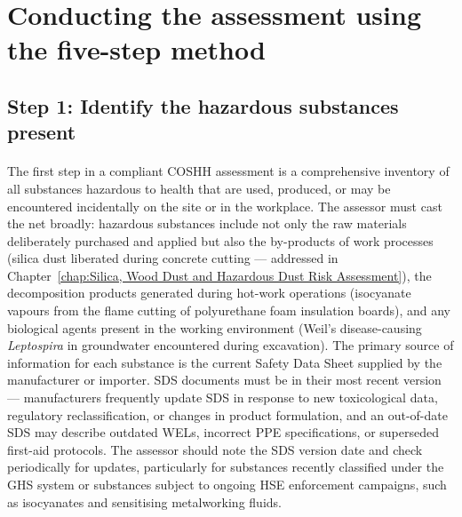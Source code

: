 \section{Conducting the assessment using the five-step method}

\subsection{Step 1: Identify the hazardous substances present}

\paragraph{}
The first step in a compliant COSHH assessment is a comprehensive inventory of all substances hazardous to health that are used, produced, or may be encountered incidentally on the site or in the workplace. The assessor must cast the net broadly: hazardous substances include not only the raw materials deliberately purchased and applied but also the by-products of work processes (silica dust liberated during concrete cutting — addressed in Chapter~\ref{chap:Silica, Wood Dust and Hazardous Dust Risk Assessment}), the decomposition products generated during hot-work operations (isocyanate vapours from the flame cutting of polyurethane foam insulation boards), and any biological agents present in the working environment (Weil's disease-causing \textit{Leptospira} in groundwater encountered during excavation). The primary source of information for each substance is the current Safety Data Sheet supplied by the manufacturer or importer. SDS documents must be in their most recent version — manufacturers frequently update SDS in response to new toxicological data, regulatory reclassification, or changes in product formulation, and an out-of-date SDS may describe outdated WELs, incorrect PPE specifications, or superseded first-aid protocols. The assessor should note the SDS version date and check periodically for updates, particularly for substances recently classified under the GHS system or substances subject to ongoing HSE enforcement campaigns, such as isocyanates and sensitising metalworking fluids.

